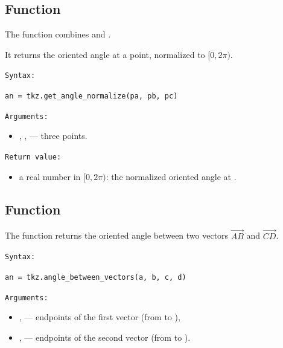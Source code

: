 

\subsection{Function }
\label{sub:tkz.get_angle_normalize}

The function  combines
 and .

It returns the oriented angle at a point, normalized to $[0, 2\pi)$.

\medskip
\texttt{Syntax: }

\begin{mybox}
\verb|an = tkz.get_angle_normalize(pa, pb, pc)|
\end{mybox}

\medskip
\texttt{Arguments: }
\begin{itemize}
  \item {}, ,  — three points.
\end{itemize}

\medskip
\texttt{Return value: }
\begin{itemize}
  \item a real number in $[0, 2\pi)$: the normalized oriented angle at .
\end{itemize}


\subsection{Function }
\label{sub:tkz_angle_between_vectors}

The function  returns the oriented angle
between two vectors $\overrightarrow{AB}$ and $\overrightarrow{CD}$.

\medskip
\texttt{Syntax:}

\begin{mybox}
\verb|an = tkz.angle_between_vectors(a, b, c, d)|
\end{mybox}

\medskip
\texttt{Arguments: }
\begin{itemize}
  \item {},  — endpoints of the first vector (from  to ),
  \item {},  — endpoints of the second vector (from  to ).
\end{itemize}

